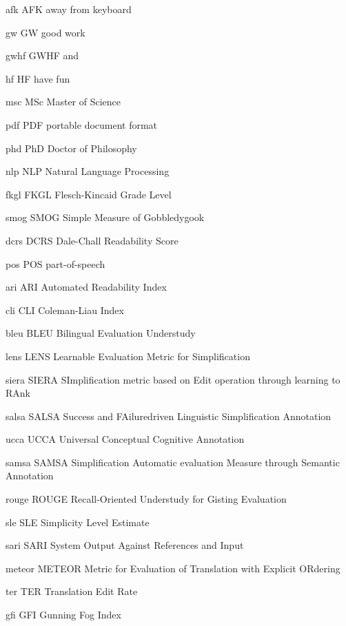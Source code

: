 \newabbreviation
{afk}
{AFK}
{away from keyboard}

\newabbreviation
{gw}
{GW}
{good work}

\newabbreviation
{gwhf}
{GWHF}
{ and }

\newabbreviation
{hf}
{HF}
{have fun}

\newabbreviation
{msc}
{MSc}
{Master of Science}

\newabbreviation
{pdf}
{PDF}
{portable document format}

\newabbreviation
{phd}
{PhD}
{Doctor of Philosophy}

\newabbreviation
{nlp}
{NLP}
{Natural Language Processing}

\newabbreviation
{fkgl}
{FKGL}
{Flesch-Kincaid Grade Level}

\newabbreviation
{smog}
{SMOG}
{Simple Measure of Gobbledygook}

\newabbreviation
{dcrs}
{DCRS}
{Dale-Chall Readability Score}

\newabbreviation
{pos}
{POS}
{part-of-speech}

\newabbreviation
{ari}
{ARI}
{Automated Readability Index}

\newabbreviation
{cli}
{CLI}
{Coleman-Liau Index}

\newabbreviation
{bleu}
{BLEU}
{Bilingual Evaluation Understudy}

\newabbreviation
{lens}
{LENS}
{Learnable Evaluation Metric for Simplification}

\newabbreviation
{siera}
{SIERA}
{SImplification metric based on Edit operation through learning to RAnk}

\newabbreviation
{salsa}
{SALSA}
{Success and FAiluredriven Linguistic Simplification Annotation}

\newabbreviation
{ucca}
{UCCA}
{Universal Conceptual Cognitive Annotation}

\newabbreviation
{samsa}
{SAMSA}
{Simplification Automatic evaluation Measure through Semantic Annotation}

\newabbreviation
{rouge}
{ROUGE}
{Recall-Oriented Understudy for Gisting Evaluation}

\newabbreviation
{sle}
{SLE}
{Simplicity Level Estimate}

\newabbreviation
{sari}
{SARI}
{System Output Against References and Input}

\newabbreviation
{meteor}
{METEOR}
{Metric for Evaluation of Translation with Explicit ORdering}

\newabbreviation
{ter}
{TER}
{Translation Edit Rate}

\newabbreviation
{gfi}
{GFI}
{Gunning Fog Index}
